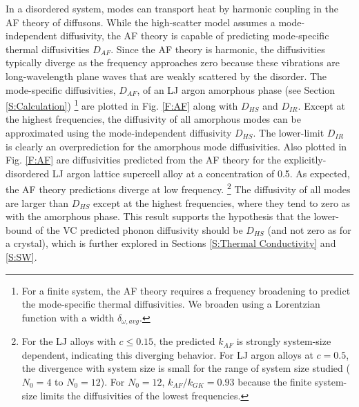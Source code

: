 In a disordered system,  
modes can transport heat by harmonic coupling in the AF theory of 
diffusons.\cite{allen_thermal_1993} 
While the high-scatter model assumes a mode-independent diffusivity, 
the AF theory is capable of predicting mode-specific thermal 
diffusivities $D_{AF}$.
\cite{feldman_thermal_1993,feldman_numerical_1999,shenogin_predicting_2009} 
Since the AF theory is harmonic, the 
diffusivities typically diverge as the frequency approaches zero 
because these vibrations are long-wavelength plane waves  
that are weakly scattered by the disorder.
\cite{sheng_introduction_2006,vitelli_heat_2010}
The mode-specific diffusivities, $D_{AF}$, of an LJ argon amorphous 
phase (see Section \ref{S:Calculation})
\footnote{For a finite system, the AF theory requires a frequency
broadening to predict the mode-specific thermal diffusivities.
\cite{allen_thermal_1993} We broaden using a Lorentzian function 
with a width $\delta_{\omega,avg}$.} are plotted in Fig. \ref{F:AF} 
along with $D_{HS}$ and $D_{IR}$. 
Except at the highest frequencies, the diffusivity of all amorphous 
modes can be approximated using the mode-independent diffusivity 
$D_{HS}$. The lower-limit $D_{IR}$ is clearly an overprediction 
for the amorphous mode diffusivities. Also plotted in Fig. \ref{F:AF} 
are diffusivities predicted from the AF theory for the 
explicitly-disordered LJ argon lattice supercell  
alloy at a concentration of 0.5. As expected, the AF theory 
predictions diverge at low frequency.
\footnote{For the LJ alloys with $c\le0.15$, the predicted $k_{AF}$ is
strongly system-size dependent, indicating this diverging behavior. For LJ
argon alloys at $c=0.5$, the divergence with system size is small for the
range of system size studied ($N_0=4$ to $N_0=12$). For $N_0=12$,
$k_{AF}/k_{GK} = 0.93$ because the finite system-size limits the
diffusivities of the lowest frequencies.} 
The diffusivity of all modes are larger than $D_{HS}$ except 
at the highest frequencies, where they tend to zero as with the amorphous 
phase. This result supports the hypothesis that the lower-bound of the 
VC predicted phonon diffusivity should be $D_{HS}$ 
(and not zero as for a crystal), 
which is further explored in Sections \ref{S:Thermal Conductivity} and 
\ref{S:SW}.


